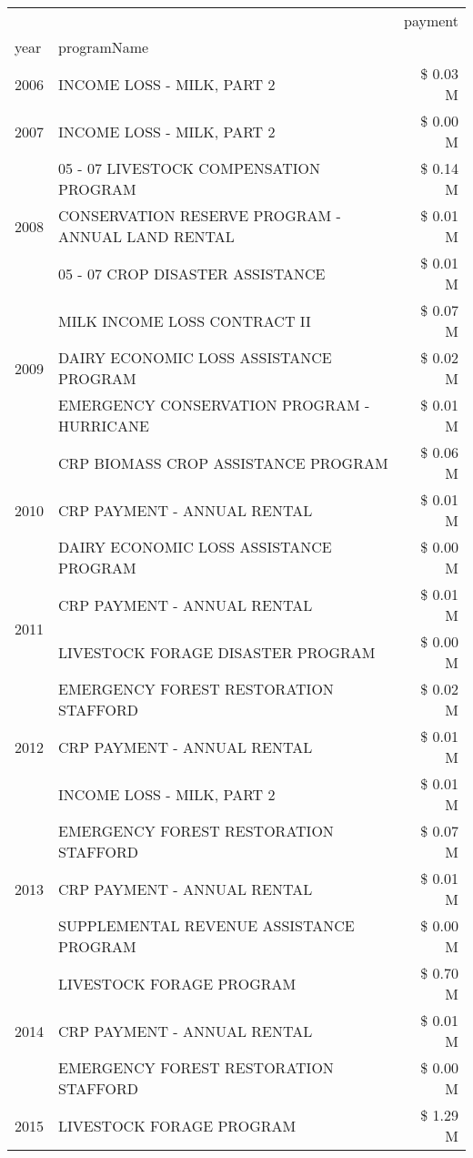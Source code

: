 \begin{tabular}{llr}
\toprule
 &  & payment \\
year & programName &  \\
\midrule
2006 & INCOME LOSS - MILK, PART 2 & \$ 0.03 M \\
\cline{1-3}
2007 & INCOME LOSS - MILK, PART 2 & \$ 0.00 M \\
\cline{1-3}
\multirow[t]{3}{*}{2008} & 05 - 07 LIVESTOCK COMPENSATION PROGRAM & \$ 0.14 M \\
 & CONSERVATION RESERVE PROGRAM - ANNUAL LAND RENTAL & \$ 0.01 M \\
 & 05 - 07 CROP DISASTER ASSISTANCE & \$ 0.01 M \\
\cline{1-3}
\multirow[t]{3}{*}{2009} & MILK INCOME LOSS CONTRACT II & \$ 0.07 M \\
 & DAIRY ECONOMIC LOSS ASSISTANCE PROGRAM & \$ 0.02 M \\
 & EMERGENCY CONSERVATION PROGRAM - HURRICANE & \$ 0.01 M \\
\cline{1-3}
\multirow[t]{3}{*}{2010} & CRP BIOMASS CROP ASSISTANCE PROGRAM & \$ 0.06 M \\
 & CRP PAYMENT - ANNUAL RENTAL & \$ 0.01 M \\
 & DAIRY ECONOMIC LOSS ASSISTANCE PROGRAM & \$ 0.00 M \\
\cline{1-3}
\multirow[t]{2}{*}{2011} & CRP PAYMENT - ANNUAL RENTAL & \$ 0.01 M \\
 & LIVESTOCK FORAGE DISASTER PROGRAM & \$ 0.00 M \\
\cline{1-3}
\multirow[t]{3}{*}{2012} & EMERGENCY FOREST RESTORATION STAFFORD & \$ 0.02 M \\
 & CRP PAYMENT - ANNUAL RENTAL & \$ 0.01 M \\
 & INCOME LOSS - MILK, PART 2 & \$ 0.01 M \\
\cline{1-3}
\multirow[t]{3}{*}{2013} & EMERGENCY FOREST RESTORATION STAFFORD & \$ 0.07 M \\
 & CRP PAYMENT - ANNUAL RENTAL & \$ 0.01 M \\
 & SUPPLEMENTAL REVENUE ASSISTANCE PROGRAM & \$ 0.00 M \\
\cline{1-3}
\multirow[t]{3}{*}{2014} & LIVESTOCK FORAGE PROGRAM & \$ 0.70 M \\
 & CRP PAYMENT - ANNUAL RENTAL & \$ 0.01 M \\
 & EMERGENCY FOREST RESTORATION STAFFORD & \$ 0.00 M \\
\cline{1-3}
\multirow[t]{2}{*}{2015} & LIVESTOCK FORAGE PROGRAM & \$ 1.29 M \\

\end{tabular}
